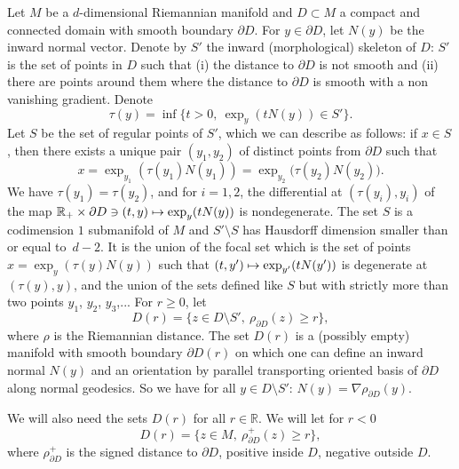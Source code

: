\documentclass[JEP,XML,SOM,Unicode,NoFloatCountersInSection,published]{cedram}
\let\backslash\setminus
\newcommand\mto{\mathchoice{\longmapsto}{\mapsto}{\mapsto}{\mapsto}}
\theoremstyle{plain}
\theoremstyle{definition}
\newcommand{\RR}{{\mathbb R}}
\let\n\nabla
\let\pa\partial
\begin{document}
Let $M$ be a $d$-dimensional Riemannian manifold
{and} $D\subset M$ a {compact and} connected domain with smooth boundary $\partial D$. For $y\in \partial D$, let $N(y)$ be the inward normal vector. Denote by $S'$ the inward (morphological) skeleton of $D$: $S'$ is the set of points in $D$ such that (i) the distance to $\partial D$ is not smooth
and (ii) there are points around them where the distance to $\pa D$ is smooth with a non vanishing gradient. Denote
\begin{equation}
\label{2.1}
\tau(y)=\inf\{t>0,\ \exp_y(t N(y))\in S'\}.
\end{equation}
Let $S$ be the set of regular points of $S'$, which we can describe as follows:
if $x\in S$, then there exists a unique pair $(y_1,y_2)$ of distinct points from $\partial D$ such that
\begin{equation}
\label{2.2}
x=\exp_{y_1}\left(\tau(y_1)N(y_1)\right)=\exp_{y_2}\bigl(\tau(y_2)N(y_2)\bigr).
\end{equation}
We have $\tau(y_1)=\tau(y_2)$, and for $i=1,2$, the differential at $(\tau(y_i),y_i)$ of the map $\RR_+\times \partial D\ni (t,y)\mto \exp_y(tN(y))$ is nondegenerate. The set $S$ is a codimension $1$ submanifold of $M$
and $S'\backslash S$ has Hausdorff dimension smaller than or equal to~$d-2$. It is the
union of the focal set which is the set of points $x=\exp_y(\tau(y)N(y))$ such that $(t,y')\mto \exp_{y'}(tN(y'))$ is degenerate at $(\tau(y), y)$, and the union of the sets defined like $S$ but with {strictly} more than two points $y_1$, $y_2$, {$y_3$,...}
For $r\ge 0$, let
\begin{equation}
\label{2.3}
D(r)=\{z\in D\backslash S', \ \rho_{\partial D} (z)\ge r\},
\end{equation}
{where $\rho$ is the Riemannian distance.}
The set $D(r)$ is a {(possibly empty)} manifold with smooth boundary $\partial D(r)$ on which one can define an inward normal $N(y)$ and an orientation by parallel transporting oriented basis of $\partial D$ along normal geodesics. So we have for all $y\in D\backslash S'$: $N(y)=\n \rho_{\partial D}(y)$.

We will also need the sets $D(r)$ for all $r\in\RR$. We will let for $r<0$
\begin{equation}
\label{2.3.1}
D(r)=\{z\in M, \ \rho^+_{\partial D} (z)\ge r\},
\end{equation}
where $\rho^+_{\partial D}$ is the signed distance to $\partial D$, positive inside $D$, negative outside $D$.
\end{document}
